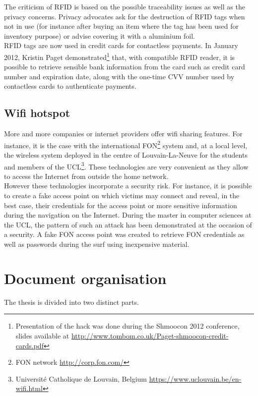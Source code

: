 The criticism of RFID is based on the possible traceability issues as well as the privacy concerns.
Privacy advocates ask for the destruction of RFID tags when not in use (for instance after buying an item where the tag has been used for inventory purpose) or advise covering it with a aluminium foil.\\

RFID tags are now used in credit cards for contactless payments.
In January 2012, Kristin Paget demonstrated\footnote{Presentation of the hack was done during the Shmoocon 2012 conference, slides available at \url{http://www.tombom.co.uk/Paget-shmoocon-credit-cards.pdf}} that, with compatible RFID reader, it is possible to retrieve sensible bank information from the card such as credit card number and expiration date, along with the one-time CVV number used by contactless cards to authenticate payments.

\subsection{Wifi hotspot}

More and more companies or internet providers offer wifi sharing features.
For instance, it is the case with the international FON\footnote{FON network \url{http://corp.fon.com/}} system and, at a local level, the wireless system deployed in the centre of Louvain-La-Neuve for the students and members of the UCL\footnote{Université Catholique de Louvain, Belgium \url{https://www.uclouvain.be/en-wifi.html}}.
These technologies are very convenient as they allow to access the Internet from outside the home network.\\

However these technologies incorporate a security risk.
For instance, it is possible to create a fake access point on which victims may connect and reveal, in the best case, their credentials for the access point or more sensitive information during the navigation on the Internet. During the master in computer sciences at the UCL, the pattern of such an attack has been demonstrated at the occasion of a security. A fake FON access point was created to retrieve FON credentials as well as passwords during the surf using inexpensive material.

\section{Document organisation}

The thesis is divided into two distinct parts.\\

